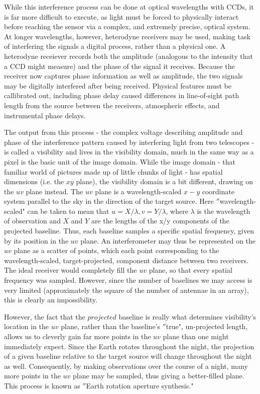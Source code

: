 While this interference process can be done at optical wavelengths with CCDs, it is far more difficult to execute, as light must be forced to physically interact before reaching the sensor via a complex, and extremely precise, optical system. At longer wavelengths, however, heterodyne receivers may be used, making task of interfering the signals a digital process, rather than a physical one. A heterodyne receiever records both the amplitude (analogous to the intensity that a CCD might measure) and the phase of the signal it receives. Because the receiver now captures phase information as well as amplitude, the two signals may be digitally interfered after being received. Physical features must be callibrated out, including phase delay caused differences in line-of-sight path length from the source between the receivers, atmospheric effects, and instrumental phase delays.


The output from this process - the complex voltage describing amplitude and phase of the interference pattern caused by interfering light from two telescopes - is called a visibility and lives in the visibility domain, much in the same way as a pixel is the basic unit of the image domain. While the image domain - that familiar world of pictures made up of little chunks of light - has spatial dimensions (i.e. the $xy$ plane), the visibility domain is a bit different, drawing on the $uv$ plane instead. The $uv$ plane is a wavelength-scaled $x-y$ coordinate system parallel to the sky in the direction of the target source. Here $''$wavelength-scaled" can be taken to mean that $u = X/\lambda, v = Y/\lambda$, where $\lambda$ is the wavelength of observation and $X$ and $Y$ are the lengths of the x/y components of the projected baseline. Thus, each baseline samples a specific spatial frequency, given by its position in the $uv$ plane. An interferometer may thus be represented on the $uv$ plane as a scatter of points, which each point corresponding to the wavelength-scaled, target-projected, component distance between two receivers. The ideal receiver would completely fill the $uv$ plane, so that every spatial frequency was sampled. However, since the number of baselines we may access is very limited (approximately the square of the number of antennae in an array), this is clearly an impossibility.

However, the fact that the $projected$ baseline is really what determines visibility's location in the $uv$ plane, rather than the baseline's $''$true", un-projected length, allows us to cleverly gain far more points in the $uv$ plane than one might immediately expect. Since the Earth rotates throughout the night, the projection of a given baseline relative to the target source will change throughout the night as well. Consequently, by making observations over the course of a night, many more points in the $uv$ plane may be sampled, thus giving a better-filled plane. This process is known as $''$Earth rotation aperture synthesis."

